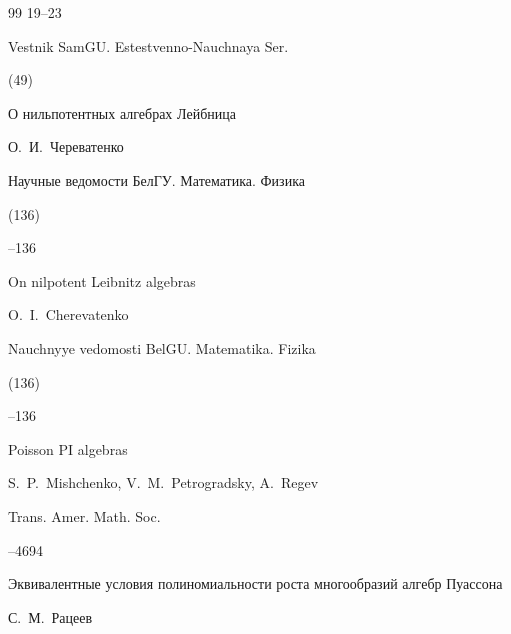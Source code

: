 \begin{thebibliography}{99}
\pages \mbox{19--23}

\jour Vestnik SamGU. Estestvenno-Nauchnaya Ser.


(49)






\paper О нильпотентных алгебрах Лейбница

\by О.~И.~Череватенко

\jour Научные ведомости БелГУ. Математика. Физика


(136)

--136

\misctransl

\paper On nilpotent Leibnitz algebras

\by O.~I.~Cherevatenko

\jour Nauchnyye vedomosti BelGU. Matematika. Fizika


(136)

--136










\paper Poisson PI algebras

\by S.~P.~Mishchenko, V.~M.~Petrogradsky, A.~Regev

\jour Trans. Amer. Math. Soc.




--4694










\paper Эквивалентные условия полиномиальности роста многообразий алгебр Пуассона

\by С.~М.~Рацеев


\end{thebibliography}
